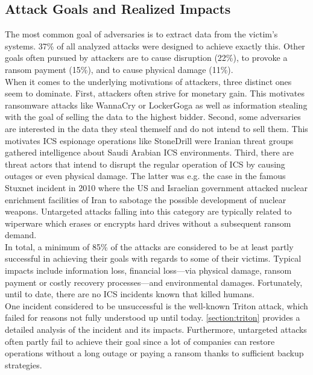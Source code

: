 \documentclass[runningheads]{llncs}
\begin{document}
\subsection{Attack Goals and Realized Impacts}
\label{subsection:overview-goals}
The most common goal of adversaries is to extract data from the victim's systems. 37\% of all analyzed attacks were designed to achieve exactly this.
Other goals often pursued by attackers are to cause disruption (22\%), to provoke a ransom payment (15\%), and to cause physical damage (11\%).\\
When it comes to the underlying motivations of attackers, three distinct ones seem to dominate.
First, attackers often strive for monetary gain.
This motivates ransomware attacks like WannaCry or LockerGoga as well as information stealing with the goal of selling the data to the highest bidder.
Second, some adversaries are interested in the data they steal themself and do not intend to sell them.
This motivates ICS espionage operations like StoneDrill were Iranian threat groups gathered intelligence about Saudi Arabian ICS environments.
Third, there are threat actors that intend to disrupt the regular operation of ICS by causing outages or even physical damage.
The latter was e.g. the case in the famous Stuxnet incident in 2010 where the US and Israelian government attacked nuclear enrichment facilities of Iran to sabotage the possible development of nuclear weapons.
Untargeted attacks falling into this category are typically related to wiperware which erases or encrypts hard drives without a subsequent ransom demand.\\
In total, a minimum of 85\% of the attacks are considered to be at least partly successful in achieving their goals with regards to some of their victims.
Typical impacts include information loss, financial loss---via physical damage, ransom payment or costly recovery processes---and environmental damages.
Fortunately, until to date, there are no ICS incidents known that killed humans.\\
One incident considered to be unsuccessful is the well-known Triton attack, which failed for reasons not fully understood up until today.
\autoref{section:triton} provides a detailed analysis of the incident and its impacts.
Furthermore, untargeted attacks often partly fail to achieve their goal since a lot of companies can restore operations without a long outage or paying a ransom thanks to sufficient backup strategies.
\end{document}
